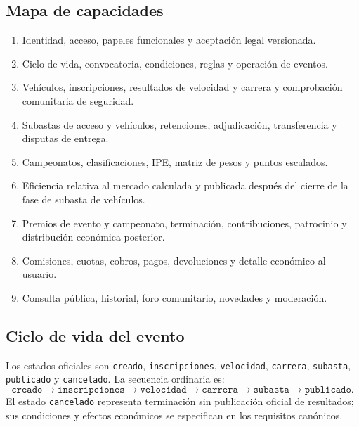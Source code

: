 \documentclass[10pt,letterpaper]{article}
\begin{document}
\subsection{Mapa de capacidades}
\begin{enumerate}
\item Identidad, acceso, papeles funcionales y aceptación legal versionada.
\item Ciclo de vida, convocatoria, condiciones, reglas y operación de eventos.
\item Vehículos, inscripciones, resultados de velocidad y carrera y comprobación comunitaria de seguridad.
\item Subastas de acceso y vehículos, retenciones, adjudicación, transferencia y disputas de entrega.
\item Campeonatos, clasificaciones, IPE, matriz de pesos y puntos escalados.
\item Eficiencia relativa al mercado calculada y publicada después del cierre de la fase de subasta de vehículos.
\item Premios de evento y campeonato, terminación, contribuciones, patrocinio y distribución económica posterior.
\item Comisiones, cuotas, cobros, pagos, devoluciones y detalle económico al usuario.
\item Consulta pública, historial, foro comunitario, novedades y moderación.
\end{enumerate}

\subsection{Ciclo de vida del evento}
Los estados oficiales son \texttt{creado}, \texttt{inscripciones}, \texttt{velocidad}, \texttt{carrera}, \texttt{subasta}, \texttt{publicado} y \texttt{cancelado}. La secuencia ordinaria es:
\[
\texttt{creado}\rightarrow\texttt{inscripciones}\rightarrow\texttt{velocidad}\rightarrow\texttt{carrera}\rightarrow\texttt{subasta}\rightarrow\texttt{publicado}.
\]
El estado \texttt{cancelado} representa terminación sin publicación oficial de resultados; sus condiciones y efectos económicos se especifican en los requisitos canónicos.
\end{document}

